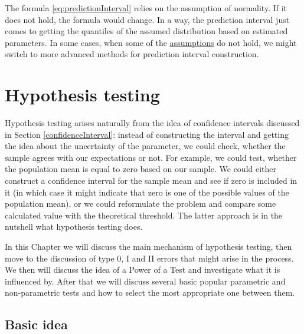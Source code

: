 \documentclass[
]{book}
\theoremstyle{definition}
\theoremstyle{definition}
\theoremstyle{definition}
\theoremstyle{definition}
\theoremstyle{remark}
\begin{document}
The formula \eqref{eq:predictionInterval} relies on the assumption of normality. If it does not hold, the formula would change. In a way, the prediction interval just comes to getting the quantiles of the assumed distribution based on estimated parameters. In some cases, when some of the \protect\hyperlink{assumptions}{assumptions} do not hold, we might switch to more advanced methods for prediction interval construction.

\hypertarget{hypothesisTesting}{%
\chapter{Hypothesis testing}\label{hypothesisTesting}}

Hypothesis testing arises naturally from the idea of confidence intervals discussed in Section \ref{confidenceInterval}: instead of constructing the interval and getting the idea about the uncertainty of the parameter, we could check, whether the sample agrees with our expectations or not. For example, we could test, whether the population mean is equal to zero based on our sample. We could either construct a confidence interval for the sample mean and see if zero is included in it (in which case it might indicate that zero is one of the possible values of the population mean), or we could reformulate the problem and compare some calculated value with the theoretical threshold. The latter approach is in the nutshell what hypothesis testing does.

In this Chapter we will discuss the main mechanism of hypothesis testing, then move to the discussion of type 0, I and II errors that might arise in the process. We then will discuss the idea of a Power of a Test and investigate what it is influenced by. After that we will discuss several basic popular parametric and non-parametric tests and how to select the most appropriate one between them.

\hypertarget{hypothesisTestingBasics}{%
\section{Basic idea}\label{hypothesisTestingBasics}}
\end{document}
